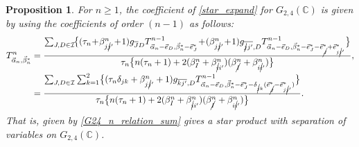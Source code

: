 \documentclass[10pt,a4paper]{amsart}
\numberwithin{equation}{section}
\newtheorem{Proposition}[Theorem]{Proposition}
 { \theoremstyle{definition}
\newtheorem{Definition}[Theorem]{Definition}
\newtheorem{Note}[Theorem]{Note}
\newtheorem{Example}[Theorem]{Example}
\newtheorem{Remark}[Theorem]{Remark} }
\begin{document}
\begin{Proposition}\label{Cor_G24_relation_sum}
For $n\geq1$, the coefficient  of \eqref{star_expand}
for $G_{2,4}(\mathbb{C})$ is given by using the coefficients of order $(n-1)$ as follows:
\begin{align}
 T^{n}_{\vec{\alpha}_{n},\vec{\beta}_{n}^{\ast}}
 ={}&
 \frac{
 \sum_{
 J,D
 \in
 \mathcal{I}
 }\!
 \bigl\{
 (
 \tau_{n}\!
 +\!
 \beta_{j\cancel{j}'}^{n}\!
 +\!
 1
 )
 g_{\overline{J}D}
 T^{n-1}_{
 \vec{\alpha}_{n}
 -
 \vec{e}_{D},
 \vec{\beta}_{n}^{\ast}
 -
 \vec{e}_{J}^{\ast}
 }\!
 +\!
 (
 \beta_{j\cancel{j}'}^{n}\!
 +\!
 1
 )
 g_{\overline{\cancel{j}j'},D}
 T^{n-1}_{
 \vec{\alpha}_{n}
 -
 \vec{e}_{D},
 \vec{\beta}_{n}^{\ast}
 -
 \vec{e}_{J}^{\ast}
 -
 \vec{e}_{\cancel{J}}^{\ast}
 +
 \vec{e}_{j\cancel{j}'}^{\ast}
 }
 \bigr\}
 }{
 \tau_{n}
 \bigl\{
 n
 (
 \tau_{n}+1
 )
 +
 2
 (
 \beta_{I}^{n}
 +
 \beta_{\cancel{i}i'}^{n}
 )
 (
 \beta_{\cancel{I}}^{n}
 +
 \beta_{i\cancel{i}'}^{n}
 )
 \bigr\}
 },
 \nonumber
 \\
 ={}&
 \frac{
 \sum_{
 J,D
 \in
 \mathcal{I}
 }
 \sum_{k=1}^{2}
 \bigl\{
 (
 \tau_{n}
 \delta_{jk}
 +
 \beta_{j\cancel{j}'}^{n}
 +
 1
 )
 g_{\overline{kj'},D}
 T^{n-1}_{
 \vec{\alpha}_{n}
 -
 \vec{e}_{D},
 \vec{\beta}_{n}^{\ast}
 -
 \vec{e}_{J}^{\ast}
 -
 \delta_{\cancel{j}k}
 (
 \vec{e}_{\cancel{J}}^{\ast}
 -
 \vec{e}_{j\cancel{j}'}^{\ast}
 )
 }
 \bigr\}
 }{
 \tau_{n}
 \bigl\{
 n
 (
 \tau_{n}+1
 )
 +
 2
 (
 \beta_{I}^{n}
 +
 \beta_{\cancel{i}i'}^{n}
 )
 (
 \beta_{\cancel{I}}^{n}
 +
 \beta_{i\cancel{i}'}^{n}
 )
 \bigr\}
 }.
\label{G24_n_relation_sum}
\end{align}
That is,  given by \eqref{G24_n_relation_sum} gives a star product with separation of variables on $G_{2,4}(\mathbb{C})$.
\end{Proposition}
\end{document}
